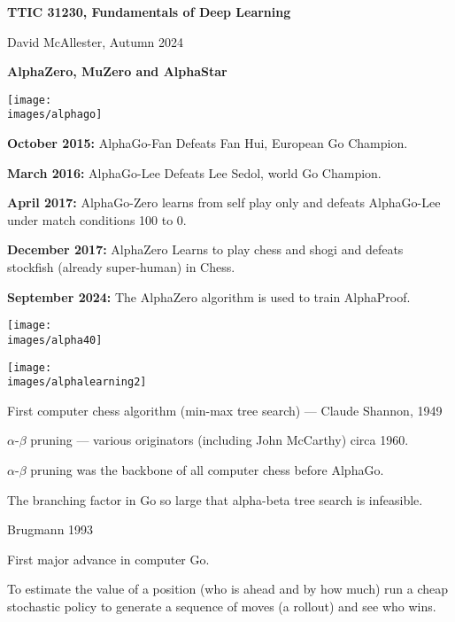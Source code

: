 




{\Huge

  \centerline{\bf TTIC 31230, Fundamentals of Deep Learning}
  \bigskip
  \centerline{David McAllester, Autumn 2024}


  \vfill
  \centerline{\bf AlphaZero, MuZero and AlphaStar}
  \vfill
  \vfill


\centerline{\texttt{[image: \\images/alphago]}}


{\bf October 2015:} AlphaGo-Fan Defeats Fan Hui, European Go Champion.

\vfill
{\bf March 2016:} AlphaGo-Lee Defeats Lee Sedol, world Go Champion.

\vfill
{\bf April 2017:} AlphaGo-Zero learns from self play only and defeats AlphaGo-Lee under match conditions 100 to 0.

\vfill
{\bf December 2017:} AlphaZero Learns to play chess and shogi and defeats stockfish (already super-human) in Chess.

\vfill
{\bf September 2024:} The AlphaZero algorithm is used to train AlphaProof.


\centerline{\texttt{[image: \\images/alpha40]}}


\centerline{\texttt{[image: \\images/alphalearning2]}}


First computer chess algorithm (min-max tree search) --- Claude Shannon, 1949

\vfill
$\alpha$-$\beta$ pruning --- various originators (including John McCarthy) circa 1960.

\vfill
$\alpha$-$\beta$ pruning was the backbone of all computer chess before AlphaGo.

\vfill
The branching factor in Go so large that alpha-beta tree search is infeasible.

{Brugmann 1993}

First major advance in computer Go.

\vfill
To estimate the value of a position (who is ahead and by how much)
run a cheap stochastic policy to generate a sequence of moves (a rollout) and see who wins.

}
